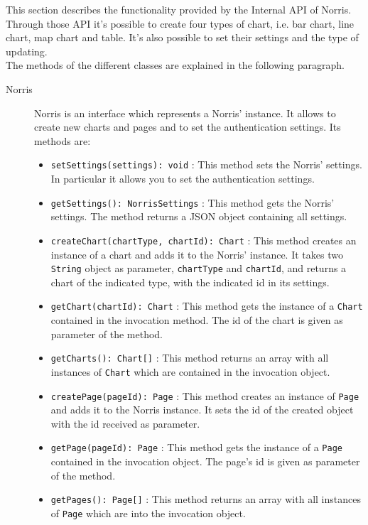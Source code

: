 	This section describes the functionality provided by the Internal API of Norris. Through those API it's possible to create four types of chart, i.e. bar chart, line chart, map chart and table. It's also possible to set their settings and the type of updating.\\ The methods of the different classes are explained in the following paragraph.
	\begin{description}
	\item[Norris] Norris is an interface which represents a Norris' instance. It allows to create new charts and pages and to set the authentication settings. Its methods are:
		\begin{itemize}
		\item \texttt{setSettings(settings): void} : This method sets the Norris' settings. In particular it allows you to set the authentication settings.
		\item \texttt{getSettings(): NorrisSettings} : This method gets the Norris' settings. The method returns a JSON object containing all settings.
		\item \texttt{createChart(chartType, chartId): Chart} : This method creates an instance of a chart and adds it to the Norris' instance. It takes two \texttt{String} object as parameter, \texttt{chartType} and \texttt{chartId}, and returns a chart of the indicated type, with the indicated id in its settings.
		\item \texttt{getChart(chartId): Chart} : This method gets the instance of a \texttt{Chart} contained in the invocation method. The id of the chart is given as parameter of the method.
		\item \texttt{getCharts(): Chart[]} : This method returns an array with all instances of \texttt{Chart} which are contained in the invocation object.
		\item \texttt{createPage(pageId): Page} : This method creates an instance of \texttt{Page} and adds it to the Norris instance. It sets the id of the created object with the id received as parameter.
		\item \texttt{getPage(pageId): Page} : This method gets the instance of a \texttt{Page} contained in the invocation object. The page's id is given as parameter of the method.
		\item \texttt{getPages(): Page[]} : This method returns an array with all instances of \texttt{Page} which are into the invocation object.
		

\end{itemize}
\end{description}
